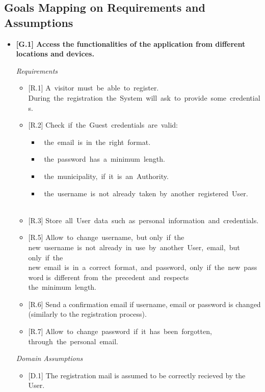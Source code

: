 \documentclass{report}
\begin{document}
\subsection{Goals Mapping on Requirements and Assumptions}
\begin{itemize}
	\item \textbf{{[G.1]} Access the functionalities of the application from different locations and devices.}
\begin{center}\large{\textit{Requirements}}\end{center}
	\begin{itemize}
		\item{[R.1]} 
		A visitor must be able to register. During the registration the System will ask to provide some credentials.
		\item {[R.2]} Check if the Guest credentials are valid:
	        \begin{itemize}
	            \item the email is in the right format.
	            \item the password has a minimum length.
	            \item the municipality, if it is an Authority.
	            \item the username is not already taken by another registered User.
	        \end{itemize}
		\item {[R.3]} Store all User data such as personal information and credentials.
		\item {[R.5]} 
		Allow to change username, but only if the new username is not already in use by another User, email, but only if the\\
		new email is in a correct format, and password, only if the new password is different from the precedent and respects \\ 
		the minimum length.
		\item {[R.6]} Send a confirmation email if username, email or password is changed (similarly to the registration process).
		\item {[R.7]} 
		Allow to change password if it has been forgotten, through the personal email.
	\end{itemize}
\begin{center}\large{\textit{Domain Assumptions}}\end{center}
	\begin{itemize}
		\item {[D.1]} The registration mail is assumed to be correctly recieved by the User.

\end{itemize}
\end{itemize}
\end{document}
